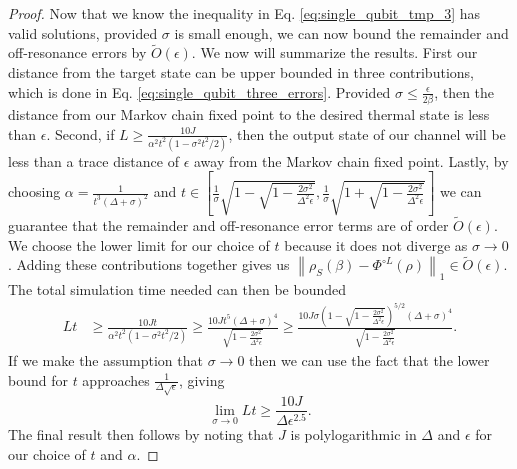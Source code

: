 \documentclass[
 amsmath,amssymb,
 aps,
onecolumn, 
nofootinbib]{revtex4-2}
\newcommand{\norm}[1]{\left\| #1 \right\|}
\newcommand{\bigotilde}[1]{\widetilde{O} \left( #1 \right)}
\begin{document}
\begin{proof}
Now that we know the inequality in Eq. \eqref{eq:single_qubit_tmp_3} has valid solutions, provided $\sigma$ is small enough, we can now bound the remainder and off-resonance errors by $\bigotilde{\epsilon}$. 
We now will summarize the results. First our distance from the target state can be upper bounded in three contributions, which is done in Eq. \eqref{eq:single_qubit_three_errors}.
Provided $\sigma \le \frac{\epsilon}{2 \beta}$, then the distance from our Markov chain fixed point to the desired thermal state is less than $\epsilon$. Second, if $L \ge \frac{10 J}{\alpha^2 t^2(1 - \sigma^2 t^2 /2) }$, then the output state of our channel will be less than a trace distance of $\epsilon$ away from the Markov chain fixed point. Lastly, by choosing $\alpha  = \frac{1}{t^3(\Delta + \sigma)^2}$ and $t \in \left[ \frac{1}{\sigma}\sqrt{1 - \sqrt{1 - \frac{2 \sigma^2}{\Delta^2 \epsilon}} }, \frac{1}{\sigma}\sqrt{1 + \sqrt{1 - \frac{2 \sigma^2}{\Delta^2 \epsilon}} } \right]$ we can guarantee that the remainder and off-resonance error terms are of order $\bigotilde{\epsilon}$.  We choose the lower limit for our choice of $t$ because it does not diverge as $\sigma\rightarrow 0$.  Adding these contributions together gives us $\norm{\rho_S(\beta) - \Phi^{\circ L }(\rho)}_1 \in \bigotilde{\epsilon}$. The total simulation time needed can then be bounded
\begin{align}
    Lt &\ge \frac{10 J t}{\alpha^2 t^2 (1 - \sigma^2 t^2 / 2)} \ge \frac{10 J t^5 (\Delta + \sigma)^4}{\sqrt{1 - \frac{2 \sigma^2}{\Delta^2 \epsilon}}} \ge \frac{10 J \sigma \left( 1 - \sqrt{1 - \frac{2 \sigma^2}{\Delta^2 \epsilon}}\right)^{5/2} (\Delta + \sigma)^4}{\sqrt{1 - \frac{2 \sigma^2}{\Delta^2 \epsilon}}}.
\end{align}
If we make the assumption that $\sigma \to 0$ then we can use the fact that the lower bound for $t$ approaches $\frac{1}{\Delta \sqrt{\epsilon}}$, giving
\begin{equation}
    \lim_{\sigma \to 0} Lt \ge \frac{10 J}{\Delta \epsilon^{2.5}}.
\end{equation}
The final result then follows by noting that $J$ is polylogarithmic in $\Delta$ and $\epsilon$ for our choice of $t$ and $\alpha$.
 \end{proof}
\end{document}

